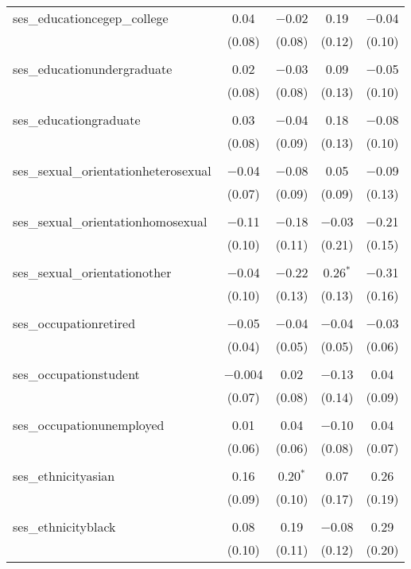 \begin{table}[!htbp]
\begin{tabular}{@{\extracolsep{5pt}}lcccc}
 ses\_educationcegep\_college & 0.04 & $-$0.02 & 0.19 & $-$0.04 \\ 
  & (0.08) & (0.08) & (0.12) & (0.10) \\ 
  & & & & \\ 
 ses\_educationundergraduate & 0.02 & $-$0.03 & 0.09 & $-$0.05 \\ 
  & (0.08) & (0.08) & (0.13) & (0.10) \\ 
  & & & & \\ 
 ses\_educationgraduate & 0.03 & $-$0.04 & 0.18 & $-$0.08 \\ 
  & (0.08) & (0.09) & (0.13) & (0.10) \\ 
  & & & & \\ 
 ses\_sexual\_orientationheterosexual & $-$0.04 & $-$0.08 & 0.05 & $-$0.09 \\ 
  & (0.07) & (0.09) & (0.09) & (0.13) \\ 
  & & & & \\ 
 ses\_sexual\_orientationhomosexual & $-$0.11 & $-$0.18 & $-$0.03 & $-$0.21 \\ 
  & (0.10) & (0.11) & (0.21) & (0.15) \\ 
  & & & & \\ 
 ses\_sexual\_orientationother & $-$0.04 & $-$0.22 & 0.26$^{*}$ & $-$0.31 \\ 
  & (0.10) & (0.13) & (0.13) & (0.16) \\ 
  & & & & \\ 
 ses\_occupationretired & $-$0.05 & $-$0.04 & $-$0.04 & $-$0.03 \\ 
  & (0.04) & (0.05) & (0.05) & (0.06) \\ 
  & & & & \\ 
 ses\_occupationstudent & $-$0.004 & 0.02 & $-$0.13 & 0.04 \\ 
  & (0.07) & (0.08) & (0.14) & (0.09) \\ 
  & & & & \\ 
 ses\_occupationunemployed & 0.01 & 0.04 & $-$0.10 & 0.04 \\ 
  & (0.06) & (0.06) & (0.08) & (0.07) \\ 
  & & & & \\ 
 ses\_ethnicityasian & 0.16 & 0.20$^{*}$ & 0.07 & 0.26 \\ 
  & (0.09) & (0.10) & (0.17) & (0.19) \\ 
  & & & & \\ 
 ses\_ethnicityblack & 0.08 & 0.19 & $-$0.08 & 0.29 \\ 
  & (0.10) & (0.11) & (0.12) & (0.20) \\ 

\end{tabular}
\end{table}
